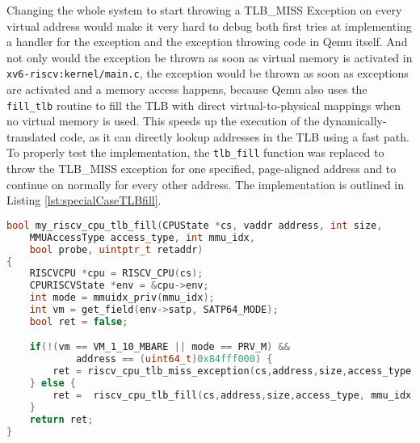 Changing the whole system to start throwing a TLB\_MISS Exception on every virtual address would make it very hard to debug both
first tries at implementing a handler for the exception and the exception throwing code in Qemu itself.
And not only would the exception be thrown as soon as virtual memory is activated in \texttt{xv6-riscv:kernel/main.c}, the exception would be thrown
as soon as exceptions are activated and a memory access happens, because Qemu also uses the \texttt{fill\_tlb} routine to fill the TLB with direct
virtual-to-physical mappings when no virtual memory is used. This speeds up the execution of the dynamically-translated code, as it can directly
lookup addresses in the TLB using a fast path.\\
To properly test the implementation, the \texttt{tlb\_fill} function was replaced to throw the TLB\_MISS exception for
one specified, page-aligned address and to continue on normally for every other address. The implementation is outlined
in Listing \ref{lst:specialCaseTLBfill}.

\begin{lstlisting}[language=c,float=t,
    caption={Alternative Implementation for the RISC-V tlb\_fill function with a special case to start testing TLB Miss Handler implementations},
    label={lst:specialCaseTLBfill}]
bool my_riscv_cpu_tlb_fill(CPUState *cs, vaddr address, int size,
    MMUAccessType access_type, int mmu_idx,
    bool probe, uintptr_t retaddr)
{
    RISCVCPU *cpu = RISCV_CPU(cs);
    CPURISCVState *env = &cpu->env;
    int mode = mmuidx_priv(mmu_idx);
    int vm = get_field(env->satp, SATP64_MODE);
    bool ret = false;

    if(!(vm == VM_1_10_MBARE || mode == PRV_M) &&
            address == (uint64_t)0x84fff000) {
        ret = riscv_cpu_tlb_miss_exception(cs,address,size,access_type, mmu_idx, probe, retaddr);
    } else {
        ret =  riscv_cpu_tlb_fill(cs,address,size,access_type, mmu_idx, probe, retaddr);
    }
    return ret;
}
\end{lstlisting}


